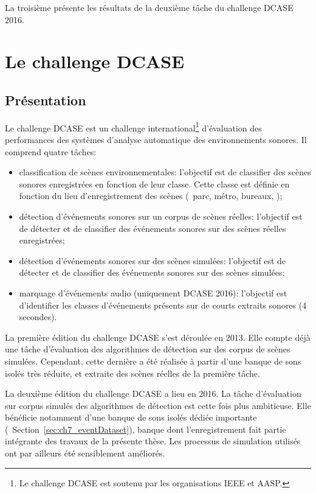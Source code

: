 La troisième présente les résultats de la deuxième tâche du challenge DCASE 2016.

\section{Le challenge DCASE}
\label{sec:ch6_challengeDcasePresentation}

\subsection{Présentation}

Le challenge DCASE est un challenge international\footnote{Le challenge DCASE est soutenu par les organisations IEEE et AASP.} d'évaluation des performances des systèmes d'analyse automatique des environnements sonores. Il comprend quatre tâches:

\begin{itemize}
\item classification de scènes environnementales: l'objectif est de classifier des scènes sonores enregistrées en fonction de leur classe. Cette classe est définie en fonction du lieu d'enregistrement des scènes (\eg~parc, métro, bureaux, \etc);
\item détection d'événements sonores sur un corpus de scènes réelles: l'objectif est de détecter et de classifier des événements sonores sur des scènes réelles enregistrées;
\item détection d'événements sonores sur des scènes simulées: l'objectif est de détecter et de classifier des événements sonores sur des scènes simulées;
\item marquage d'événements audio (uniquement DCASE 2016): l'objectif est d'identifier les classes d'événements présents sur de courts extraits sonores (4 secondes).
\end{itemize}

La première édition du challenge DCASE \citep{Giannoulis2013database, giannoulis2013detection, Stowell15} s'est déroulée en 2013. Elle compte déjà une tâche d'évaluation des algorithmes de détection sur des corpus de scènes simulées. Cependant, cette dernière a été réalisée à partir d'une banque de sons isolés très réduite, et extraite des scènes réelles de la première tâche.

La deuxième édition du challenge DCASE a lieu en 2016. La tâche d'évaluation sur corpus simulés des algorithmes de détection est cette fois plus ambitieuse. Elle bénéficie notamment d'une banque de sons isolés dédiée importante (\cf~Section~\ref{sec:ch7_eventDataset}), banque dont l'enregistrement fait partie intégrante des travaux de la présente thèse. Les processus de simulation utilisés ont par ailleurs été sensiblement améliorés.

